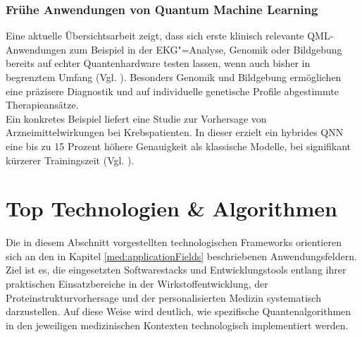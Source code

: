 \subsubsection*{Frühe Anwendungen von Quantum Machine Learning}
Eine aktuelle Übersichtsarbeit zeigt, dass sich erste klinisch relevante QML-Anwendungen zum Beispiel in der EKG"=Analyse, Genomik oder Bildgebung bereits auf echter Quantenhardware testen lassen, wenn auch bisher in begrenztem Umfang (Vgl. \cite{gupta_systematic_2025}). Besonders Genomik und Bildgebung ermöglichen eine präzisere Diagnostik und auf individuelle genetische Profile abgestimmte Therapieansätze.\\

Ein konkretes Beispiel liefert eine Studie zur Vorhersage von Arzneimittelwirkungen bei Krebspatienten. In dieser erzielt ein hybrides QNN eine bis zu 15 Prozent höhere Genauigkeit als klassische Modelle, bei signifikant kürzerer Trainingszeit (Vgl. \cite{sagingalieva_hybrid_2023}).\\

\begin{table}[ht]
\centering
\renewcommand{\arraystretch}{1.3}
\caption{Anwendungsfelder des Quantencomputings in der Medizin und Pharmazie}
\label{tab:qc_medizin}
\end{table}



\section{Top Technologien \& Algorithmen}
Die in diesem Abschnitt vorgestellten technologischen Frameworks orientieren sich an den in Kapitel \ref{med:applicationFields} beschriebenen Anwendungsfeldern. Ziel ist es, die eingesetzten Softwarestacks und Entwicklungstools entlang ihrer praktischen Einsatzbereiche in der Wirkstoffentwicklung, der Proteinstrukturvorhersage und der personalisierten Medizin systematisch darzustellen. Auf diese Weise wird deutlich, wie spezifische Quantenalgorithmen in den jeweiligen medizinischen Kontexten technologisch implementiert werden.\\

